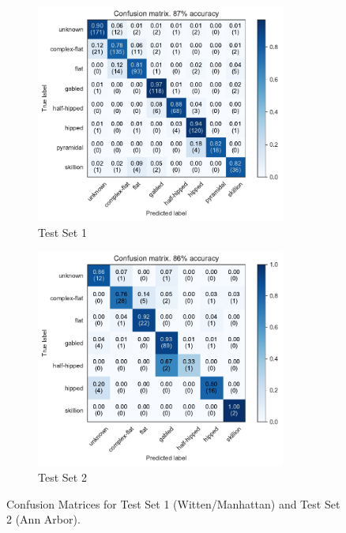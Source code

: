 \begin{figure}[t!]
    \centering
    \begin{subfigure}[t]{0.50\columnwidth}
        \centering
        \includegraphics[width=0.90\textwidth]{chapter_4_roofshape/imgs/allclasses_combined_dual.pdf}
        \caption{Test Set     1}
        \label{fig:dual_test_combined_cm}
    \end{subfigure}
    \hfill
    \begin{subfigure}[t]{0.49\columnwidth}
        \centering
        \includegraphics[width=0.90\textwidth]{chapter_4_roofshape/imgs/allclasses_aa_annarbor_dual.pdf}
        \caption{Test Set     2}
        \label{fig:dual_test_annarbor_cm}
    \end{subfigure}
    \caption[Confusion Matrices for Test Set 1 (Witten/Manhattan) and Test Set 2 (Ann Arbor).]{Confusion Matrices for Test Set 1 (Witten/Manhattan) and Test Set 2 (Ann Arbor). }
    \label{fig:dual_tes_cm}
    \hfill
\end{figure}

